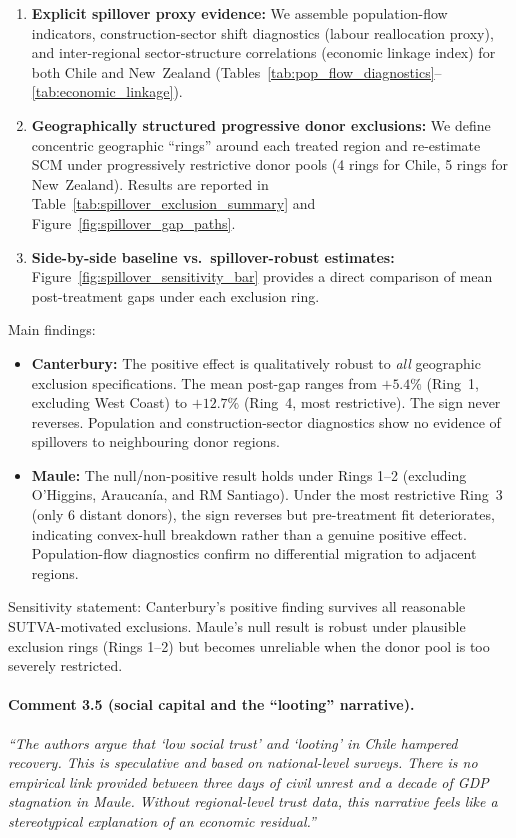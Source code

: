 \begin{enumerate}
  \item \textbf{Explicit spillover proxy evidence:} We assemble population-flow indicators, construction-sector shift diagnostics (labour reallocation proxy), and inter-regional sector-structure correlations (economic linkage index) for both Chile and New~Zealand (Tables~\ref{tab:pop_flow_diagnostics}--\ref{tab:economic_linkage}).
  \item \textbf{Geographically structured progressive donor exclusions:} We define concentric geographic ``rings'' around each treated region and re-estimate SCM under progressively restrictive donor pools (4 rings for Chile, 5 rings for New~Zealand). Results are reported in Table~\ref{tab:spillover_exclusion_summary} and Figure~\ref{fig:spillover_gap_paths}.
  \item \textbf{Side-by-side baseline vs.\ spillover-robust estimates:} Figure~\ref{fig:spillover_sensitivity_bar} provides a direct comparison of mean post-treatment gaps under each exclusion ring.
\end{enumerate}

Main findings:
\begin{itemize}
  \item \textbf{Canterbury:} The positive effect is qualitatively robust to \emph{all} geographic exclusion specifications. The mean post-gap ranges from $+5.4\%$ (Ring~1, excluding West Coast) to $+12.7\%$ (Ring~4, most restrictive). The sign never reverses. Population and construction-sector diagnostics show no evidence of spillovers to neighbouring donor regions.
  \item \textbf{Maule:} The null/non-positive result holds under Rings 1--2 (excluding O'Higgins, Araucanía, and RM Santiago). Under the most restrictive Ring~3 (only 6 distant donors), the sign reverses but pre-treatment fit deteriorates, indicating convex-hull breakdown rather than a genuine positive effect. Population-flow diagnostics confirm no differential migration to adjacent regions.
\end{itemize}

Sensitivity statement: Canterbury's positive finding survives all reasonable SUTVA-motivated exclusions. Maule's null result is robust under plausible exclusion rings (Rings 1--2) but becomes unreliable when the donor pool is too severely restricted.

\paragraph{Comment 3.5 (social capital and the ``looting'' narrative).}
\textit{``The authors argue that `low social trust' and `looting' in Chile hampered recovery. This is speculative and based on national-level surveys. There is no empirical link provided between three days of civil unrest and a decade of GDP stagnation in Maule. Without regional-level trust data, this narrative feels like a stereotypical explanation of an economic residual.''}

